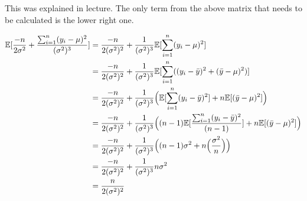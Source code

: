 
This was explained in lecture. 
The only term from the above matrix that needs to be calculated is the lower right one.

\begin{align*}
\mathbb{E}[\frac{-n}{2\sigma^2} +\frac{\sum_{i=1}^n (y_i - \mu)^2 }{(\sigma^2)^3}] 
&=\frac{-n}{2(\sigma^2)^2} + \frac{1}{(\sigma^2)^3}\mathbb{E}[\sum_{i=1}^n (y_i - \mu)^2] \\
&=\frac{-n}{2(\sigma^2)^2} + \frac{1}{(\sigma^2)^3}\mathbb{E}[\sum_{i=1}^n ((y_i - \bar{y})^2 +  (\bar{y} -\mu)^2)] \\
&=\frac{-n}{2(\sigma^2)^2} + \frac{1}{(\sigma^2)^3}\Big(\mathbb{E}[\sum_{i=1}^n (y_i - \bar{y})^2] +  n\mathbb{E}[(\bar{y} -\mu)^2]\Big) \\
&=\frac{-n}{2(\sigma^2)^2} + \frac{1}{(\sigma^2)^3}\Big((n-1)\mathbb{E}[\frac{\sum_{i=1}^n (y_i - \bar{y})^2}{(n-1)}] +  n\mathbb{E}[(\bar{y} -\mu)^2]\Big) \\
&=\frac{-n}{2(\sigma^2)^2} + \frac{1}{(\sigma^2)^3}\Big((n-1)\sigma^2 +  n\Big(\frac{\sigma^2}{n}\Big)\Big)\\
&=\frac{-n}{2(\sigma^2)^2} + \frac{1}{(\sigma^2)^3}n\sigma^2\\
&=\frac{n}{2(\sigma^2)^2}
\end{align*}

